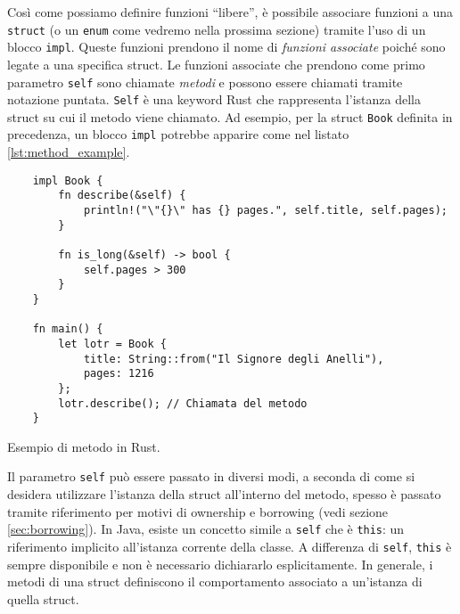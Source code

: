 Così come possiamo definire funzioni ``libere'', è possibile associare funzioni a una \texttt{struct} (o un \texttt{enum} come vedremo nella prossima sezione) tramite l'uso di un blocco \texttt{impl}. Queste funzioni prendono il nome di \textit{funzioni associate} poiché sono legate a una specifica struct. Le funzioni associate che prendono come primo parametro \texttt{self} sono chiamate \textit{metodi} e possono essere chiamati tramite notazione puntata. \texttt{Self} è una keyword Rust che rappresenta l'istanza della struct su cui il metodo viene chiamato. Ad esempio, per la struct \texttt{Book} definita in precedenza, un blocco \texttt{impl} potrebbe apparire come nel listato \ref{lst:method_example}.
\begin{listing}
    \begin{verbatim}
    impl Book {
        fn describe(&self) {
            println!("\"{}\" has {} pages.", self.title, self.pages);
        }

        fn is_long(&self) -> bool {
            self.pages > 300
        }
    }

    fn main() {
        let lotr = Book { 
            title: String::from("Il Signore degli Anelli"),
            pages: 1216
        };
        lotr.describe(); // Chiamata del metodo
    }
    \end{verbatim}
    \caption{Esempio di metodo in Rust.}
    \label{lst:method_example}
\end{listing}

Il parametro \texttt{self} può essere passato in diversi modi, a seconda di come si desidera utilizzare l'istanza della struct all'interno del metodo, spesso è passato tramite riferimento per motivi di ownership e borrowing (vedi sezione \ref{sec:borrowing}). In Java, esiste un concetto simile a \texttt{self} che è \texttt{this}: un riferimento implicito all'istanza corrente della classe. A differenza di \texttt{self}, \texttt{this} è sempre disponibile e non è necessario dichiararlo esplicitamente. In generale, i metodi di una struct definiscono il comportamento associato a un'istanza di quella struct.

